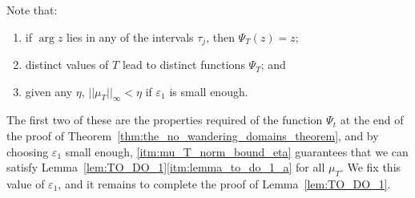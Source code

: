 Note that:
\begin{enumerate}[label=(\alph*)]
    \item \label{itm:Psi_T_identity_on_tau} if $\arg z$ lies in any of the
    intervals $\tau_j$, then $\Psi_T(z) = z$;
    \item \label{itm:distinct_T_imply_distinct_Psi_T} distinct values of $T$
    lead to distinct functions $\Psi_T$; and
    \item \label{itm:mu_T_norm_bound_eta} given any $\eta$, $||\mu_T||_\infty <
    \eta$ if $\varepsilon_1$ is small enough.
\end{enumerate}

The first two of these are the properties required of the function $\Psi_t$ at
the end of the proof of Theorem~\ref{thm:the_no_wandering_domains_theorem}, and
by choosing $\varepsilon_1$ small enough, \ref{itm:mu_T_norm_bound_eta} guarantees
that we can satisfy Lemma~\ref{lem:TO_DO_1}\ref{itm:lemma_to_do_1_a} for all
$\mu_T$. We fix this value of $\varepsilon_1$, and it remains to complete the proof
of Lemma~\ref{lem:TO_DO_1}.

